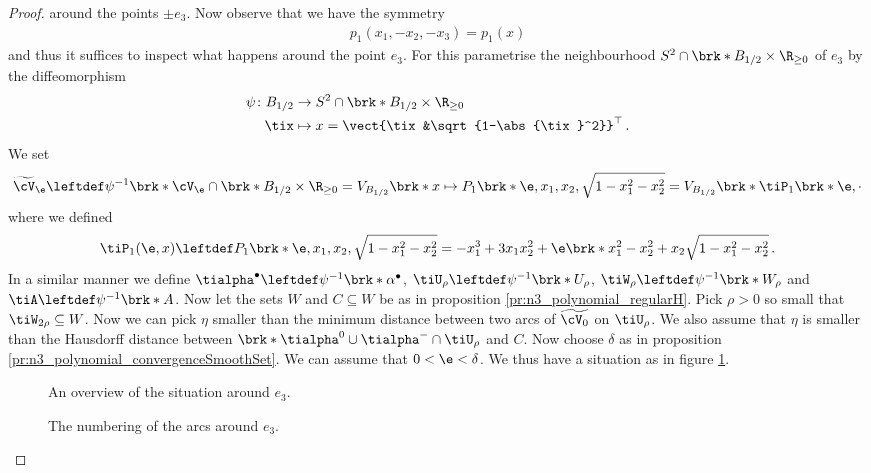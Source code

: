 \begin{proof}
  around the points $\pm e_3$.
  Now observe that we have the symmetry
  \begin{align}
    p_1(x_1,-x_2,-x_3)=p_1(x)\label{eq:n3_polynomial_smoothConnected_symmetr}
  \end{align}
  and thus it suffices to inspect what happens around the point $e_3$.
  For this parametrise the neigh\-bour\-hood $S^2\cap \brk*{B_{1/2}\times\R_{\geq0}}$
  of $e_3$
  by the diffeomorphism
  \begin{align*}
    \psi\colon B_{1/2}&\to S^2\cap \brk*{B_{1/2}\times\R_{\geq0}}\\
    \tix&\mapsto x=\vect{\tix&\sqrt{1-\abs{\tix}^2}}^\top\,.
  \end{align*}
  We set
  \begin{align*}
    \widetilde{\cV}_\e\leftdef\psi^{-1}\brk*{\cV_\e\cap \brk*{B_{1/2}\times\R_{\geq0}}}
    =V_{B_{1/2}}\brk*{x\mapsto P_1\brk*{\e,x_1,x_2,\sqrt{1-x_1^2-x_2^2}}}
    =V_{B_{1/2}}\brk*{\tiP_1\brk*{\e,\cdot}}
  \end{align*}
  where we defined
  \begin{align*}
    \tiP_1(\e,x)\leftdef P_1\brk*{\e,x_1,x_2,\sqrt{1-x_1^2-x_2^2}}
    =-x_1^3+3x_1x_2^2+\e\brk*{x_1^2-x_2^2+x_2\sqrt{1-x_1^2-x_2^2}}\,.
  \end{align*}
  In a similar manner we define $\tialpha^\bullet\leftdef\psi^{-1}\brk*{\alpha^\bullet}$, $\tiU_\rho\leftdef\psi^{-1}\brk*{U_\rho}$,
  $\tiW_\rho\leftdef\psi^{-1}\brk*{W_\rho}$
  and $\tiA\leftdef\psi^{-1}\brk*{A}$.
  Now let the sets $W$ and $C\subseteq W$ be as in proposition \ref{pr:n3_polynomial_regularH}.
  Pick $\rho>0$ so small that $\tiW_{2\rho}\subseteq W$. 
  Now we can pick $\eta$ smaller than the minimum distance between two arcs of $\widetilde{\cV_0}$ on $\tiU_{\rho}$.
  We also assume that $\eta$ is smaller than the Hausdorff distance between $\brk*{\tialpha^0\cup\tialpha^-}\cap\tiU_\rho$
  and $C$.
  Now choose $\delta$ as in proposition \ref{pr:n3_polynomial_convergenceSmoothSet}. We can assume that $0<\e<\delta$.
  We thus have a situation as in figure \ref{fi:n3_polynomial_arcOverview}.
  \begin{figure}
    \centering
    
    \caption{An overview of the situation around $e_3$.}
    \label{fi:n3_polynomial_arcOverview}
  \end{figure}
  \begin{figure}
    \centering
    
    \caption{The numbering of the arcs around $e_3$.}

\end{figure}
\end{proof}
